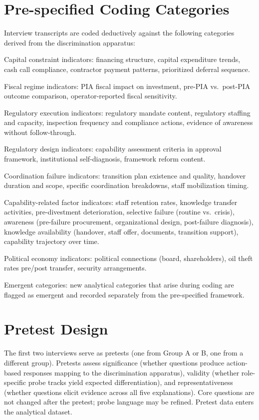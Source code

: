 \hypertarget{pre-specified-coding-categories}{%
\section{Pre-specified Coding
Categories}\label{pre-specified-coding-categories}}

Interview transcripts are coded deductively against the following
categories derived from the discrimination apparatus:

Capital constraint indicators: financing structure, capital expenditure
trends, cash call compliance, contractor payment patterns, prioritized
deferral sequence.

Fiscal regime indicators: PIA fiscal impact on investment, pre-PIA
vs.~post-PIA outcome comparison, operator-reported fiscal sensitivity.

Regulatory execution indicators: regulatory mandate content, regulatory
staffing and capacity, inspection frequency and compliance actions,
evidence of awareness without follow-through.

Regulatory design indicators: capability assessment criteria in approval
framework, institutional self-diagnosis, framework reform content.

Coordination failure indicators: transition plan existence and quality,
handover duration and scope, specific coordination breakdowns, staff
mobilization timing.

Capability-related factor indicators: staff retention rates, knowledge
transfer activities, pre-divestment deterioration, selective failure
(routine vs.~crisis), awareness (pre-failure procurement, organizational
design, post-failure diagnosis), knowledge availability (handover, staff
offer, documents, transition support), capability trajectory over time.

Political economy indicators: political connections (board,
shareholders), oil theft rates pre/post transfer, security arrangements.

Emergent categories: new analytical categories that arise during coding
are flagged as emergent and recorded separately from the pre-specified
framework.

\hypertarget{pretest-design}{%
\section{Pretest Design}\label{pretest-design}}

The first two interviews serve as pretests (one from Group A or B, one
from a different group). Pretests assess significance (whether questions
produce action-based responses mapping to the discrimination apparatus),
validity (whether role-specific probe tracks yield expected
differentiation), and representativeness (whether questions elicit
evidence across all five explanations). Core questions are not changed
after the pretest; probe language may be refined. Pretest data enters
the analytical dataset.
